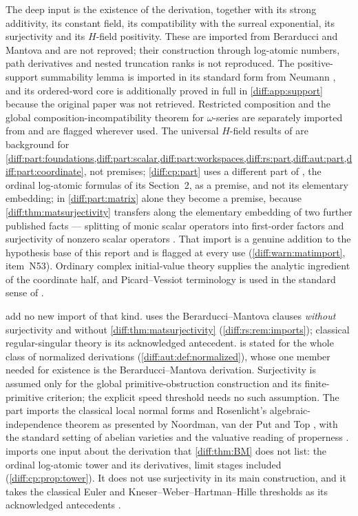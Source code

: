 \documentclass[11pt,letterpaper]{article}
\numberwithin{equation}{section}
\theoremstyle{definition}
\theoremstyle{remark}
\begin{document}
The deep input is the existence of the derivation, together with its strong
additivity, its constant field, its compatibility with the surreal
exponential, its surjectivity and its $H$-field positivity. These are imported
from Berarducci and Mantova \cite{BM} and are not reproved; their construction
through log-atomic numbers, path derivatives and nested truncation ranks is
not reproduced. The positive-support summability lemma is imported in its
standard form from Neumann \cite{Neumann}, and its ordered-word core is
additionally proved in full in \cref{diff:app:support} because the original
paper was not retrieved. Restricted composition and the global
composition-incompatibility theorem for $\omega$-series are separately imported
from \cite{BMGerms} and are flagged wherever used. The universal $H$-field
results of \cite{ADH} are background for
\cref{diff:part:foundations,diff:part:scalar,diff:part:workspaces,diff:rs:part,diff:aut:part,diff:part:coordinate},
not premises; \cref{diff:cp:part} uses a different part of \cite{ADH}, the
ordinal log-atomic formulas of its Section~2, as a premise, and not its
elementary embedding; in \cref{diff:part:matrix} alone they become a premise, because
\cref{diff:thm:matsurjectivity} transfers along the elementary embedding of
\cite{ADH} two further published facts --- splitting of monic scalar operators
into first-order factors and surjectivity of nonzero scalar operators
\cite[Lemma 2.4.19]{ADHNorm}. That import is a genuine addition to the
hypothesis base of this report and is flagged at every use
(\cref{diff:warn:matimport}, item~N53). Ordinary complex
initial-value theory \cite{Teschl} supplies the analytic ingredient of the
coordinate half, and Picard--Vessiot terminology is used in the standard sense
of \cite{PS,Singer}.

 add no new import of that kind.  uses
the Berarducci--Mantova clauses \emph{without} surjectivity and without
\cref{diff:thm:matsurjectivity} (\cref{diff:rs:rem:imports}); classical
regular-singular theory \cite{Levelt,KW,vdH} is its acknowledged antecedent.
 is stated for the whole class of normalized derivations
(\cref{diff:aut:def:normalized}), whose one member needed for existence is the
Berarducci--Mantova derivation. Surjectivity is assumed only for the
global primitive-obstruction construction and its finite-primitive
criterion; the explicit speed threshold needs no such assumption.
The part imports the classical local normal forms and Rosenlicht's
algebraic-independence theorem as presented by Noordman, van der Put and Top
\cite{NPT}, with the standard setting of abelian varieties \cite{Milne} and the
valuative reading of properness \cite{Stacks}.
 imports one input about the derivation that
\cref{diff:thm:BM} does not list: the ordinal log-atomic tower and its
derivatives, limit stages included \cite[Section~2]{ADH}
(\cref{diff:cp:prop:tower}). It does not use surjectivity in its main
construction, and it takes the classical Euler and
Kneser--Weber--Hartman--Hille thresholds as its acknowledged antecedents
\cite{KT}.
\end{document}

